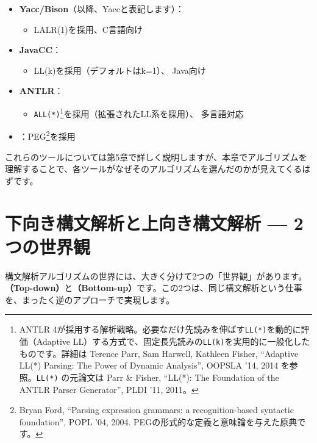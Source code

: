 \begin{itemize}
\item
  \textbf{\sffamily Yacc/Bison}（以降、Yaccと表記します）：

  \begin{itemize}
  \item
    LALR(1)を採用、C言語向け
  \end{itemize}
\item
  \textbf{\sffamily JavaCC}：

  \begin{itemize}
  \item
    LL(k)を採用（デフォルトはk=1）、 Java向け
  \end{itemize}
\item
  \textbf{\sffamily ANTLR}：

  \begin{itemize}
  \item
    \texttt{ALL(*)}\footnote{ANTLR
      4が採用する解析戦略。必要なだけ先読みを伸ばす\texttt{LL(*)}を動的に評価（Adaptive
      LL）する方式で、固定長先読みの\texttt{LL(k)}を実用的に一般化したものです。詳細は
      Terence Parr, Sam Harwell, Kathleen Fisher, ``Adaptive LL(*)
      Parsing: The Power of Dynamic Analysis'', OOPSLA '14, 2014
      を参照。\texttt{LL(*)} の元論文は Parr \& Fisher, ``LL(*): The
      Foundation of the ANTLR Parser Generator'', PLDI '11, 2011。}を採用（拡張されたLL系を採用）、 多言語対応
  \end{itemize}
\item
  ：PEG\footnote{Bryan Ford, ``Parsing
    expression grammars: a recognition-based syntactic foundation'',
    POPL '04, 2004. PEGの形式的な定義と意味論を与えた原典です。}を採用
\end{itemize}

これらのツールについては第5章で詳しく説明しますが、本章でアルゴリズムを理解することで、各ツールがなぜそのアルゴリズムを選んだのかが見えてくるはずです。

\section{下向き構文解析と上向き構文解析 --- 2つの世界観}

構文解析アルゴリズムの世界には、大きく分けて2つの「世界観」があります。\textbf{\sffamily （Top-down）}と\textbf{\sffamily （Bottom-up）}です。この2つは、同じ構文解析という仕事を、まったく逆のアプローチで実現します。

